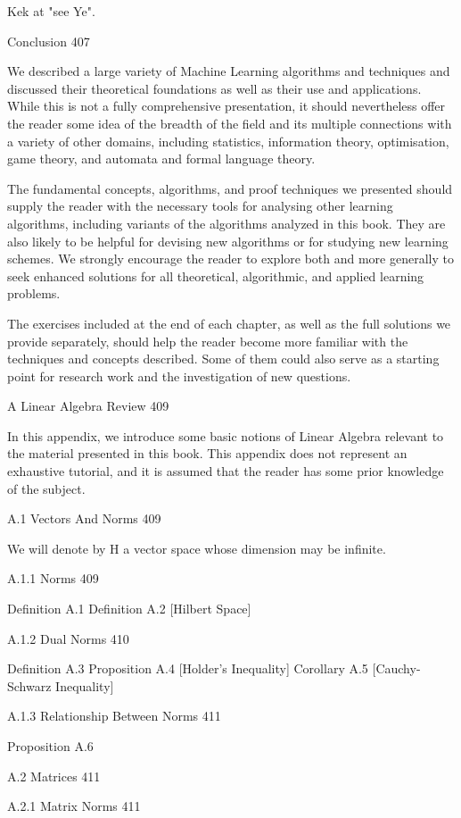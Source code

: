Kek at "see Ye".

Conclusion 407

We described a large variety of Machine Learning algorithms and techniques and discussed their theoretical foundations as well as their use and applications. While this is not a fully comprehensive presentation, it should nevertheless offer the reader some idea of the breadth of the field and its multiple connections with a variety of other domains, including statistics, information theory, optimisation, game theory, and automata and formal language theory.

The fundamental concepts, algorithms, and proof techniques we presented should supply the reader with the necessary tools for analysing other learning algorithms, including variants of the algorithms analyzed in this book. They are also likely to be helpful for devising new algorithms or for studying new learning schemes. We strongly encourage the reader to explore both and more generally to seek enhanced solutions for all theoretical, algorithmic, and applied learning problems.

The exercises included at the end of each chapter, as well as the full solutions we provide separately, should help the reader become more familiar with the techniques and concepts described. Some of them could also serve as a starting point for research work and the investigation of new questions.

A Linear Algebra Review 409

In this appendix, we introduce some basic notions of Linear Algebra relevant to the material presented in this book. This appendix does not represent an exhaustive tutorial, and it is assumed that the reader has some prior knowledge of the subject.

A.1 Vectors And Norms 409

We will denote by H a vector space whose dimension may be infinite.

A.1.1 Norms 409

Definition A.1
Definition A.2 [Hilbert Space]

A.1.2 Dual Norms 410

Definition A.3
Proposition A.4 [Holder's Inequality]
Corollary A.5 [Cauchy-Schwarz Inequality]

A.1.3 Relationship Between Norms 411

Proposition A.6

A.2 Matrices 411



A.2.1 Matrix Norms 411




